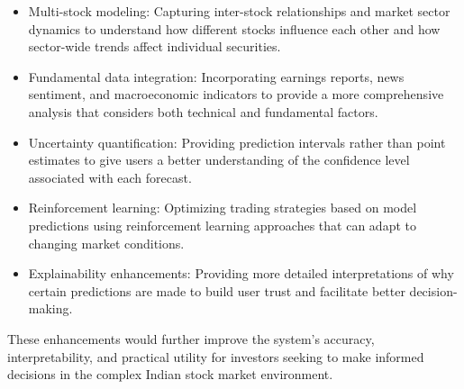\documentclass[conference]{IEEEtran}
\begin{document}
\begin{itemize}
\item Multi-stock modeling: Capturing inter-stock relationships and market sector dynamics to understand how different stocks influence each other and how sector-wide trends affect individual securities.

\item Fundamental data integration: Incorporating earnings reports, news sentiment, and macroeconomic indicators to provide a more comprehensive analysis that considers both technical and fundamental factors.

\item Uncertainty quantification: Providing prediction intervals rather than point estimates to give users a better understanding of the confidence level associated with each forecast.

\item Reinforcement learning: Optimizing trading strategies based on model predictions using reinforcement learning approaches that can adapt to changing market conditions.

\item Explainability enhancements: Providing more detailed interpretations of why certain predictions are made to build user trust and facilitate better decision-making.
\end{itemize}

These enhancements would further improve the system's accuracy, interpretability, and practical utility for investors seeking to make informed decisions in the complex Indian stock market environment.
\end{document}
